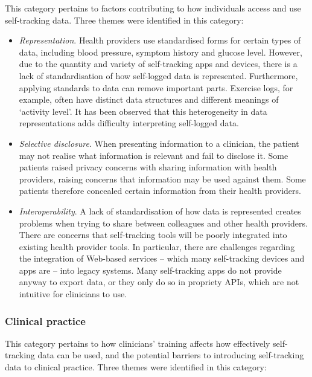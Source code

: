 \documentclass{sigchi}
\begin{document}
This category pertains to factors contributing to how individuals access and use self-tracking data. Three themes were identified in this category:

\begin{itemize}
    \item \textit{Representation}. Health providers use standardised forms for certain types of data, including blood pressure, symptom history and glucose level. However, due to the quantity and variety of self-tracking apps and devices, there is a lack of standardisation of how self-logged data is represented. Furthermore, applying standards to data can remove important parts. Exercise logs, for example, often have distinct data structures and different meanings of `activity level'. It has been observed that this heterogeneity in data representations adds difficulty interpreting self-logged data.
    
    \item \textit{Selective disclosure}. When presenting information to a clinician, the patient may not realise what information is relevant and fail to disclose it. Some patients raised privacy concerns with sharing information with health providers, raising concerns that information may be used against them. Some patients therefore concealed certain information from their health providers.
    
    \item \textit{Interoperability}. A lack of standardisation of how data is represented creates problems when trying to share between colleagues and other health providers. There are concerns that self-tracking tools will be poorly integrated into existing health provider tools. In particular, there are challenges regarding the integration of Web-based services -- which many self-tracking devices and apps are -- into legacy systems. Many self-tracking apps do not provide anyway to export data, or they only do so in propriety APIs, which are not intuitive for clinicians to use.
\end{itemize}

\subsubsection{Clinical practice}

This category pertains to how clinicians' training affects how effectively self-tracking data can be used, and the potential barriers to introducing self-tracking data to clinical practice. Three themes were identified in this category:
\end{document}

